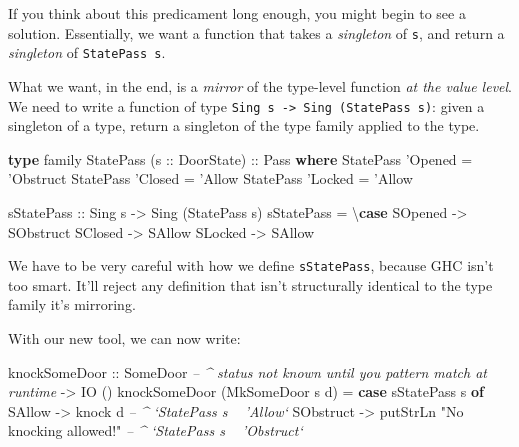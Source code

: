 \documentclass[]{article}
\newenvironment{Shaded}{}{}
\newcommand{\CommentTok}[1]{\textcolor[rgb]{0.38,0.63,0.69}{\textit{#1}}}
\newcommand{\DataTypeTok}[1]{\textcolor[rgb]{0.56,0.13,0.00}{#1}}
\newcommand{\FunctionTok}[1]{\textcolor[rgb]{0.02,0.16,0.49}{#1}}
\newcommand{\KeywordTok}[1]{\textcolor[rgb]{0.00,0.44,0.13}{\textbf{#1}}}
\newcommand{\NormalTok}[1]{#1}
\newcommand{\OtherTok}[1]{\textcolor[rgb]{0.00,0.44,0.13}{#1}}
\newcommand{\StringTok}[1]{\textcolor[rgb]{0.25,0.44,0.63}{#1}}
\begin{document}
If you think about this predicament long enough, you might begin to see a
solution. Essentially, we want a function that takes a \emph{singleton} of
\texttt{s}, and return a \emph{singleton} of \texttt{StatePass\ s}.

What we want, in the end, is a \emph{mirror} of the type-level function \emph{at
the value level}. We need to write a function of type
\texttt{Sing\ s\ -\textgreater{}\ Sing\ (StatePass\ s)}: given a singleton of a
type, return a singleton of the type family applied to the type.

\begin{Shaded}
\begin{Highlighting}[]
\KeywordTok{type}\NormalTok{ family }\DataTypeTok{StatePass}\NormalTok{ (}\OtherTok{s ::} \DataTypeTok{DoorState}\NormalTok{)}\OtherTok{ ::} \DataTypeTok{Pass} \KeywordTok{where}
    \DataTypeTok{StatePass}\NormalTok{ '}\DataTypeTok{Opened} \FunctionTok{=}\NormalTok{ '}\DataTypeTok{Obstruct}
    \DataTypeTok{StatePass}\NormalTok{ '}\DataTypeTok{Closed} \FunctionTok{=}\NormalTok{ '}\DataTypeTok{Allow}
    \DataTypeTok{StatePass}\NormalTok{ '}\DataTypeTok{Locked} \FunctionTok{=}\NormalTok{ '}\DataTypeTok{Allow}

\OtherTok{sStatePass ::} \DataTypeTok{Sing}\NormalTok{ s }\OtherTok{->} \DataTypeTok{Sing}\NormalTok{ (}\DataTypeTok{StatePass}\NormalTok{ s)}
\NormalTok{sStatePass }\FunctionTok{=}\NormalTok{ \textbackslash{}}\KeywordTok{case}
    \DataTypeTok{SOpened} \OtherTok{->} \DataTypeTok{SObstruct}
    \DataTypeTok{SClosed} \OtherTok{->} \DataTypeTok{SAllow}
    \DataTypeTok{SLocked} \OtherTok{->} \DataTypeTok{SAllow}
\end{Highlighting}
\end{Shaded}

We have to be very careful with how we define \texttt{sStatePass}, because GHC
isn't too smart. It'll reject any definition that isn't structurally identical
to the type family it's mirroring.

With our new tool, we can now write:

\begin{Shaded}
\begin{Highlighting}[]
\NormalTok{knockSomeDoor}
\OtherTok{    ::} \DataTypeTok{SomeDoor}     \CommentTok{-- ^ status not known until you pattern match at runtime}
    \OtherTok{->} \DataTypeTok{IO}\NormalTok{ ()}
\NormalTok{knockSomeDoor (}\DataTypeTok{MkSomeDoor}\NormalTok{ s d) }\FunctionTok{=} \KeywordTok{case}\NormalTok{ sStatePass s }\KeywordTok{of}
    \DataTypeTok{SAllow}    \OtherTok{->}\NormalTok{ knock d                         }\CommentTok{-- ^ `StatePass s ~ 'Allow`}
    \DataTypeTok{SObstruct} \OtherTok{->}\NormalTok{ putStrLn }\StringTok{"No knocking allowed!"} \CommentTok{-- ^ `StatePass s ~ 'Obstruct`}
\end{Highlighting}
\end{Shaded}
\end{document}

